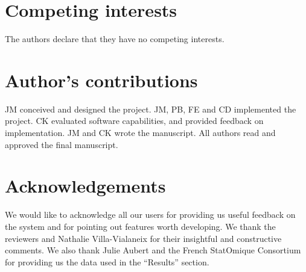 \documentclass{bmcart}
\begin{document}
\begin{backmatter}

\section*{Competing interests}
The authors declare that they have no competing interests.

\section*{Author's contributions}
JM conceived and designed the project. JM, PB, FE and CD implemented the project.
CK evaluated software capabilities, and provided feedback on implementation. JM
and CK wrote the manuscript. All authors read and approved the final manuscript.

\section*{Acknowledgements}
We would like to acknowledge all our users for providing us useful feedback on
the system and for pointing out features worth developing. We thank the
reviewers and Nathalie Villa-Vialaneix for their insightful and constructive
comments. We also thank Julie Aubert and the French StatOmique Consortium for
providing us the data used in the ``Results'' section.





\end{backmatter}
\end{document}
